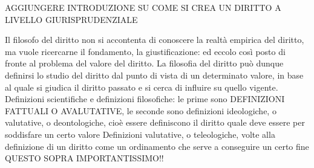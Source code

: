 AGGIUNGERE INTRODUZIONE SU COME SI CREA UN DIRITTO A LIVELLO GIURISPRUDENZIALE





Il filosofo del diritto non si accontenta di conoscere la realtà empirica del diritto, ma vuole ricercarne il fondamento, la giustificazione: ed eccolo così posto di fronte al problema del valore del diritto. La filosofia del diritto può dunque definirsi lo studio del diritto dal punto di vista di un determinato valore, in base al quale si giudica il diritto passato e si cerca di influire su quello vigente.
Definizioni scientifiche e definizioni filosofiche: le prime sono DEFINIZIONI FATTUALI O AVALUTATIVE, le seconde sono definizioni ideologiche, o valutative, o deontologiche, cioè essere definiscono il diritto quale deve essere per soddisfare un certo valore 
Definizioni valutative, o teleologiche, volte alla definizione di un diritto come un ordinamento che serve a conseguire un certo fine
QUESTO SOPRA IMPORTANTISSIMO!!

